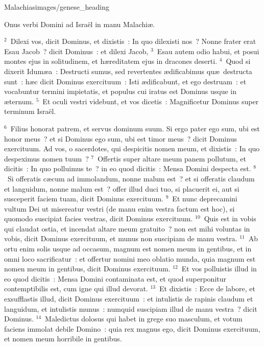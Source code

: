 {Malachias}{images/genese_heading}


\lettrine[lines=6,image=true,loversize=0.05,lraise=-0.03]{O}{}nus verbi Domini ad Isra\"el in manu Malachi\ae .


${}^{2}$~Dilexi vos, dicit Dominus, et dixistis~: In quo dilexisti nos~? Nonne frater erat Esau Jacob~? dicit Dominus~: et dilexi Jacob,
${}^{3}$~Esau autem odio habui, et posui montes ejus in solitudinem, et h\ae reditatem ejus in dracones deserti.
${}^{4}$~Quod si dixerit Idum\ae a~: Destructi sumus, sed revertentes \ae dificabimus qu\ae\ destructa sunt~: h\ae c dicit Dominus exercituum~: Isti \ae dificabunt, et ego destruam~: et vocabuntur termini impietatis, et populus cui iratus est Dominus usque in \ae ternum.
${}^{5}$~Et oculi vestri videbunt, et vos dicetis~: Magnificetur Dominus super terminum Isra\"el.


${}^{6}$~Filius honorat patrem, et servus dominum suum. Si ergo pater ego sum, ubi est honor meus~? et si Dominus ego sum, ubi est timor meus~? dicit Dominus exercituum. Ad vos, o sacerdotes, qui despicitis nomen meum, et dixistis~: In quo despeximus nomen tuum~?
${}^{7}$~Offertis super altare meum panem pollutum, et dicitis~: In quo polluimus te~? in eo quod dicitis~: Mensa Domini despecta est.
${}^{8}$~Si offeratis c\ae cum ad immolandum, nonne malum est~? et si offeratis claudum et languidum, nonne malum est~? offer illud duci tuo, si placuerit ei, aut si susceperit faciem tuam, dicit Dominus exercituum.
${}^{9}$~Et nunc deprecamini vultum Dei ut misereatur vestri (de manu enim vestra factum est hoc), si quomodo suscipiat facies vestras, dicit Dominus exercituum.
${}^{10}$~Quis est in vobis qui claudat ostia, et incendat altare meum gratuito~? non est mihi voluntas in vobis, dicit Dominus exercituum, et munus non suscipiam de manu vestra.
${}^{11}$~Ab ortu enim solis usque ad occasum, magnum est nomen meum in gentibus, et in omni loco sacrificatur~: et offertur nomini meo oblatio munda, quia magnum est nomen meum in gentibus, dicit Dominus exercituum.
${}^{12}$~Et vos polluistis illud in eo quod dicitis~: Mensa Domini contaminata est, et quod superponitur contemptibilis est, cum igne qui illud devorat.
${}^{13}$~Et dixistis~: Ecce de labore, et exsufflastis illud, dicit Dominus exercituum~: et intulistis de rapinis claudum et languidum, et intulistis munus~: numquid suscipiam illud de manu vestra~? dicit Dominus.
${}^{14}$~Maledictus dolosus qui habet in grege suo masculum, et votum faciens immolat debile Domino~: quia rex magnus ego, dicit Dominus exercituum, et nomen meum horribile in gentibus.

